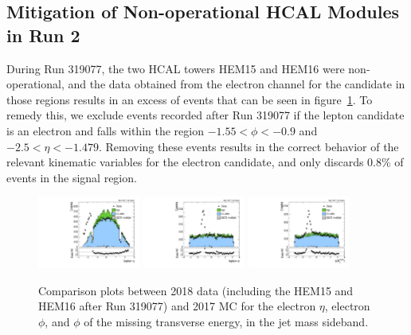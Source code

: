 \subsection{Mitigation of Non-operational HCAL Modules in Run 2}

During Run 319077, the two HCAL towers HEM15 and HEM16 were non-operational, and the data obtained from the electron channel for the \Wtolnu candidate in those regions results in an excess of events that can be seen in figure~\ref{fig:SB_controlPlots2018_electronexcess}. %
To remedy this, we exclude events recorded after Run 319077 if the lepton candidate is an electron and falls within the region $-1.55<\phi<-0.9$ and $-2.5<\eta<-1.479$.
Removing these events results in the correct behavior of the relevant kinematic variables for the electron candidate, and only discards 0.8\% of events in the signal region.

\begin{figure}[htbp]
  \centering
  \includegraphics[width=0.30\textwidth]{fig/controlPlots/SB_e_2018_lnujj_l1_l_eta.pdf}
  \includegraphics[width=0.30\textwidth]{fig/controlPlots/SB_e_2018_lnujj_l1_l_phi.pdf}
  \includegraphics[width=0.30\textwidth]{fig/controlPlots/SB_e_2018_met_phi.pdf}
  \caption{
    Comparison plots between 2018 data (including the HEM15 and HEM16 after Run 319077) and 2017 MC for the electron $\eta$, electron $\phi$, and $\phi$ of the missing transverse energy, in the jet mass sideband.
  }
  \label{fig:SB_controlPlots2018_electronexcess}
\end{figure}

